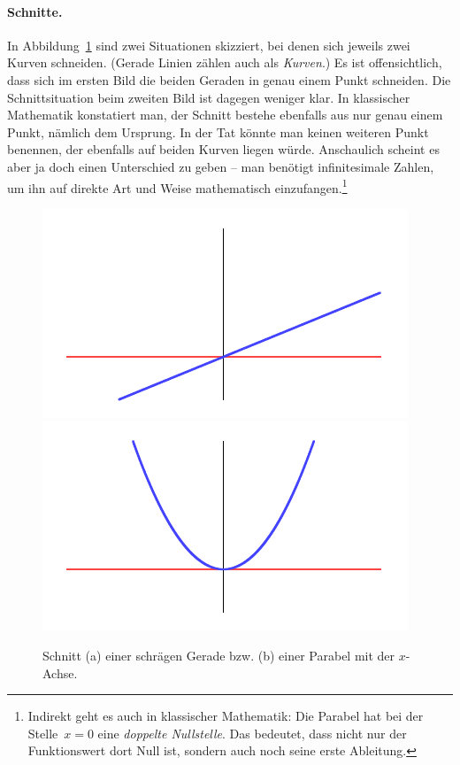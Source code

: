 \documentclass[twoside]{../zirkelblatt}
\theoremstyle{definition}
\theoremstyle{plain}
\theoremstyle{remark}
\begin{document}
\paragraph{Schnitte.} In Abbildung~\ref{fig:schnittverhalten} sind zwei Situationen skizziert, bei
denen sich jeweils zwei Kurven schneiden. (Gerade Linien zählen
auch als \emph{Kurven}.) Es ist offensichtlich, dass sich im ersten
Bild die beiden Geraden in genau einem Punkt schneiden. Die Schnittsituation
beim zweiten Bild ist dagegen weniger klar. In klassischer Mathematik konstatiert man,
der Schnitt bestehe ebenfalls aus nur genau einem Punkt, nämlich dem Ursprung.
In der Tat könnte man keinen weiteren Punkt benennen, der ebenfalls auf beiden
Kurven liegen würde. Anschaulich scheint es aber ja doch einen Unterschied zu
geben -- man benötigt infinitesimale Zahlen, um ihn auf direkte Art und Weise
mathematisch einzufangen.\footnote{Indirekt geht es auch in klassischer
Mathematik: Die Parabel hat bei der Stelle~$x = 0$ eine \emph{doppelte
Nullstelle}. Das bedeutet, dass nicht nur der Funktionswert dort Null ist,
sondern auch noch seine erste Ableitung.}
\begin{figure}[b]
  \centering
  \includegraphics{sdg-schnittverhalten1}
  \includegraphics{sdg-schnittverhalten2}
  \caption{\label{fig:schnittverhalten}Schnitt (a) einer schrägen Gerade
  bzw. (b) einer Parabel mit der $x$-Achse.}
\end{figure}
\end{document}
